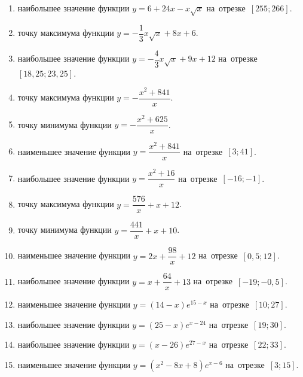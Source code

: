 \documentclass[a4paper,10pt]{article}
\begin{document}
\begin{enumerate}
\item {} наибольшее значение функции $y=6+24x -x\sqrt{x}$ на~отрезке~$\left[255;266\right]$.

\item {} точку максимума функции $y=-\dfrac{1}{3}x\sqrt{x} +8x+6$.

\item {} наибольшее значение функции $y=-\dfrac{4}{3}x\sqrt{x} +9x+12$ на~отрезке~$\left[18,25;23,25\right]$.

\item {} точку максимума функции $y=-\dfrac{x^2 +841}{x}$.

\item {} точку минимума функции $y=-\dfrac{x^2 +625}{x}$.

\item {} наименьшее значение функции $y=\dfrac{x^2 +841}{x}$ на~отрезке~$\left[3;41\right]$.

\item {} наибольшее значение функции $y=\dfrac{x^2 +16}{x}$ на~отрезке~$\left[-16;-1\right]$.

\item {} точку максимума функции $y=\dfrac{576}{x} +x+12$.

\item {} точку минимума функции $y=\dfrac{441}{x} +x+10$.

\item {} наименьшее значение функции $y=2x+\dfrac{98}{x} +12$ на~отрезке~$\left[0,5;12\right]$.

\item {} наибольшее значение функции $y=x+\dfrac{64}{x} +13$ на~отрезке~$\left[-19;-0,5\right]$.

\item {} наименьшее значение функции $y=\left(14-x\right)e^{15-x}$ на~отрезке~$\left[10;27\right]$.

\item {} наибольшее значение функции $y=\left(25-x\right)e^{x-24}$ на~отрезке~$\left[19;30\right]$.

\item {} наибольшее значение функции $y=\left(x-26\right)e^{27-x}$ на~отрезке~$\left[22;33\right]$.

\item {} наименьшее значение функции $y=\left(x^2 -8x +8\right)e^{x -6}$ на~отрезке~$\left[3;15\right]$.


\end{enumerate}
\end{document}
